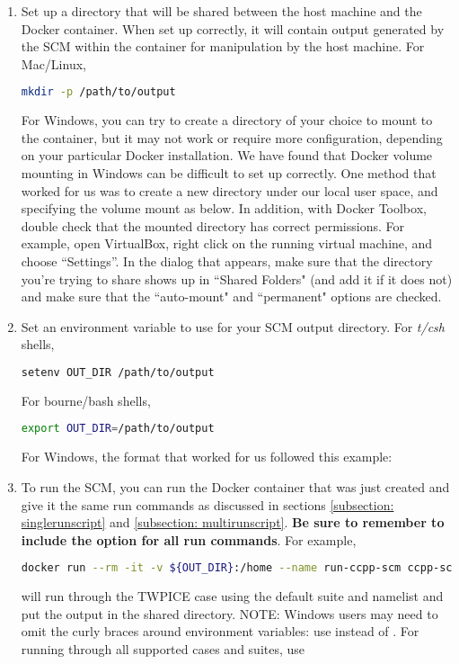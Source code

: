 \begin{enumerate}
\item Set up a directory that will be shared between the host machine and the Docker container. When set up correctly, it will contain output generated by the SCM within the container for manipulation by the host machine. For Mac/Linux,
\begin{lstlisting}[language=bash]
mkdir -p /path/to/output
\end{lstlisting}
For Windows, you can try to create a directory of your choice to mount to the container, but it may not work or require more configuration, depending on your particular Docker installation. We have found that Docker volume mounting in Windows can be difficult to set up correctly. One method that worked for us was to create a new directory under our local user space, and specifying the volume mount as below. In addition, with Docker Toolbox, double check that the mounted directory has correct permissions. For example, open VirtualBox, right click on the running virtual machine, and choose ``Settings''. In the dialog that appears, make sure that the directory you're trying to share shows up in ``Shared Folders" (and add it if it does not) and make sure that the ``auto-mount" and ``permanent" options are checked.
\item Set an environment variable to use for your SCM output directory. For \textit{t/csh} shells,
\begin{lstlisting}[language=bash]
setenv OUT_DIR /path/to/output
\end{lstlisting}
For bourne/bash shells,
\begin{lstlisting}[language=bash]
export OUT_DIR=/path/to/output
\end{lstlisting}
For Windows, the format that worked for us followed this example: 
\item To run the SCM, you can run the Docker container that was just created and give it the same run commands as discussed in sections \ref{subsection: singlerunscript} and \ref{subsection: multirunscript}. \textbf{Be sure to remember to include the  option for all run commands}. For example,
\begin{lstlisting}[language=bash]
docker run --rm -it -v ${OUT_DIR}:/home --name run-ccpp-scm ccpp-scm ./run_gmtb_scm.py -c twpice -d
\end{lstlisting}
will run through the TWPICE case using the default suite and namelist and put the output in the shared directory. NOTE: Windows users may need to omit the curly braces around environment variables: use  instead of . For running through all supported cases and suites, use

\end{enumerate}
